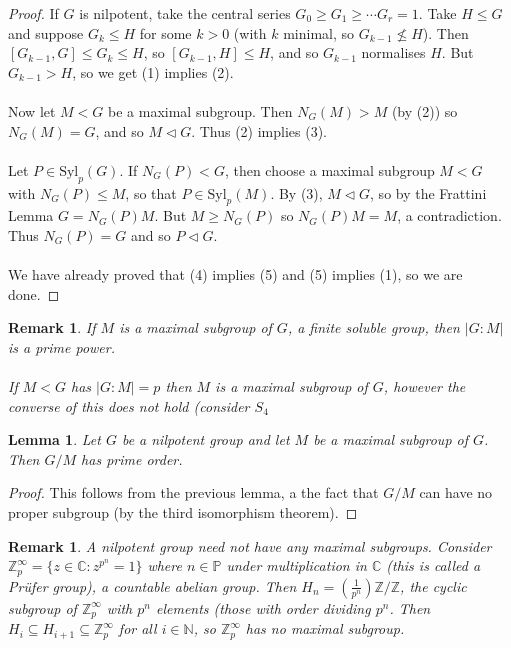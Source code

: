 \documentclass[a4paper,10pt]{article}
\newcommand{\CC}{\mathbb{C}}
\newcommand{\NN}{\mathbb{N}}
\newcommand{\ZZ}{\mathbb{Z}}
\newtheorem{Lem}[thm]{Lemma}
\newtheorem{rem}[thm]{Remark}
\begin{document}
\begin{proof}
If $G$ is nilpotent, take the central series $G_0 \geq G_1 \geq \cdots G_r = 1$. Take $H \leq G$ and suppose $G_k \leq H$ for some $k > 0$ (with $k$ minimal, so $G_{k-1} \not\leq H$). Then $[G_{k-1}, G] \leq G_k \leq H$, so $[G_{k-1} , H] \leq H$, and so $G_{k-1}$ normalises $H$. But $G_{k-1} > H$, so we get (1) implies (2). \\
\\
Now let $M < G$ be a maximal subgroup. Then $N_G(M) > M$ (by (2)) so $N_G(M) = G$, and so $M \triangleleft G$. Thus (2) implies (3).\\
\\
Let $P \in \text{Syl}_p(G)$. If $N_G(P) < G$, then choose a maximal subgroup $M < G$ with $N_G(P) \leq M$, so that $P \in \text{Syl}_p(M)$. By (3), $M \triangleleft G$, so by the Frattini Lemma $G = N_G(P) M$. But $M \geq N_G(P)$ so $N_G(P) M = M$, a contradiction. Thus $N_G(P) = G$ and so $P \triangleleft G$. \\
\\
We have already proved that (4) implies (5) and (5) implies (1), so we are done.
\end{proof}

\begin{rem}
If $M$ is a maximal subgroup of $G$, a finite soluble group, then $|G : M|$ is a prime power.\\
\\
If $M < G$ has $|G : M| = p$ then $M$ is a maximal subgroup of $G$, however the converse of this does not hold (consider $S_4$
\end{rem}

\begin{Lem}
Let $G$ be a nilpotent group and let $M$ be a maximal subgroup of $G$. Then $G / M$ has prime order. 
\end{Lem}

\begin{proof}
This follows from the previous lemma, a the fact that $G / M$ can have no proper subgroup (by the third isomorphism theorem).
\end{proof}

\begin{rem}
A nilpotent group need not have any maximal subgroups. Consider $\ZZ_p^\infty = \{ z \in \CC : z^{p^n} = 1 \}$ where $n \in \mathbb{P}$ under multiplication in $\CC$ (this is called a Pr\"{u}fer group), a countable abelian group. Then $H_n = \left( \frac{1}{p^n} \right) \ZZ / \ZZ$, the cyclic subgroup of $\ZZ_p^\infty$ with $p^n$ elements (those with order dividing $p^n$.  Then $H_i \subseteq H_{i+1} \subseteq \ZZ_p^\infty$ for all $i \in \NN$, so $\ZZ_p^\infty$ has no maximal subgroup. 
\end{rem}
\end{document}
